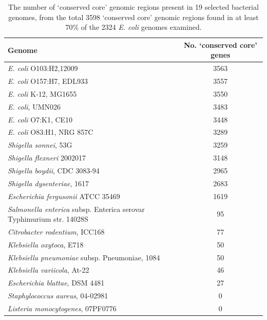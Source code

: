 \documentclass[doublespacing, linenumbers]{bmcart}
\begin{document}
\begin{backmatter}
\newpage
\begin{table}[h!]
\caption{The number of `conserved core' genomic regions present in 19 selected bacterial genomes, from the total 3598 `conserved core' genomic regions found in at least 70\% of the 2324 \textit{E. coli} genomes examined.}
\label{tab:specific_distribution}
      \begin{tabular}{lc}
        \hline
        Genome & No. `conserved core' genes\\ 
        \hline
        \textit{E. coli} O103:H2,12009 & 3563\\
        \textit{E. coli} O157:H7, EDL933 & 3557\\
        \textit{E. coli} K-12, MG1655 & 3550\\
        \textit{E. coli}, UMN026 & 3483\\
        \textit{E. coli} O7:K1, CE10 & 3448\\
        \textit{E. coli} O83:H1, NRG 857C & 3289\\
        \textit{Shigella sonnei}, 53G & 3259\\
        \textit{Shigella flexneri} 2002017 & 3148\\
        \textit{Shigella boydii}, CDC 3083-94 & 2965\\
        \textit{Shigella dysenteriae}, 1617 & 2683\\        
        \textit{Escherichia fergusonii} ATCC 35469  & 1619\\
        \textit{Salmonella enterica} subsp. Enterica serovar Typhimurium str. 14028S & 95\\
        \textit{Citrobacter rodentium}, ICC168 & 77\\
        \textit{Klebsiella oxytoca}, E718 & 50\\
        \textit{Klebsiella pneumoniae} subsp. Pneumoniae, 1084 & 50\\
        \textit{Klebsiella variicola}, At-22 & 46\\
        \textit{Escherichia blattae}, DSM 4481 & 27\\ 
        \textit{Staphylococcus aureus}, 04-02981 & 0\\
        \textit{Listeria monocytogenes}, 07PF0776 & 0\\
        \hline
      \end{tabular}
\end{table}


\end{backmatter}
\end{document}

